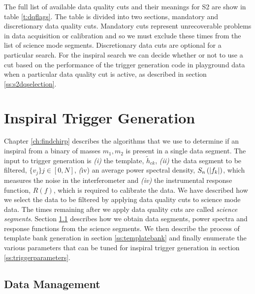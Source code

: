 The full list of available data quality cuts and their meanings for S2 are
show in table \ref{t:dqflags}. The table is divided into two sections,
mandatory and discretionary data quality cuts. Mandatory cuts represent
unrecoverable problems in data acquisition or calibration and so we must exclude
these times from the list of science mode segments. Discretionary data cuts
are optional for a particular search. For the inspiral search we can decide
whether or not to use a cut based on the performance of the trigger generation
code in playground data when a particular data quality cut is active, as
described in section \ref{ss:s2dqselection}.

\section{Inspiral Trigger Generation}
\label{s:pipetemplate}

Chapter \ref{ch:findchirp} describes the algorithms that we use to determine
if an inspiral from a binary of masses ${m_1,m_2}$ is present in a single data
segment. The input to trigger generation is \emph{(i)} the template,
$\tilde{h}_{ck}$, \emph{(ii)} the data segment to be filtered, $\{v_j\} j \in
[0,N]$, \emph(iv) an average power spectral density, $S_n\left(\left|f_{k}\right|\right)$, which measures
the noise in the interferometer and \emph{(iv)} the instrumental response
function, $R(f)$, which is required to calibrate the data. We have described
how we select the data to be filtered by applying data quality cuts to science
mode data. The times remaining after we apply data quality cuts are called
\emph{science segments}. Section \ref{ss:datamanagement} describes how we
obtain data segments, power spectra and response functions from the science
segments. We then describe the process of template bank generation in section
\ref{ss:templatebank} and finally enumerate the various parameters that can be
tuned for inspiral trigger generation in section \ref{ss:triggerparameters}.

\subsection{Data Management}
\label{ss:datamanagement}

